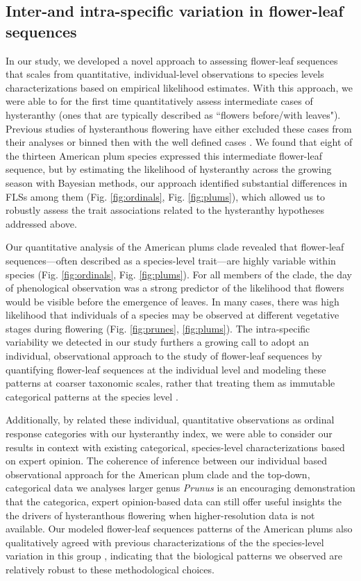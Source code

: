 \documentclass{article}[11pt]
\begin{document}
{\subsection*{Inter-and intra-specific variation in flower-leaf sequences}
In our study, we developed a novel approach to assessing flower-leaf sequences that scales from quantitative, individual-level observations to species levels characterizations based on empirical likelihood estimates. With this approach, we were able to for the first time quantitatively assess intermediate cases of hysteranthy (ones that are typically described as ``flowers before/with leaves"). Previous studies of hysteranthous flowering have either excluded these cases from their analyses  \citep[e.g.;][]{Gougherty2018} or binned then with the well defined cases \citep[e.g.;][]{Buonaiuto2020}. We found that eight of the thirteen American plum species expressed this intermediate flower-leaf sequence, but by estimating the likelihood of hysteranthy across the growing season with Bayesian methods, our approach identified substantial differences in FLSs among them (Fig. \ref{fig:ordinals}, Fig. \ref{fig:plums}), which allowed us to robustly assess the trait associations related to the hysteranthy hypotheses addressed above.

Our quantitative analysis of the American plums clade revealed that flower-leaf sequences---often described as a species-level trait---are highly variable within species (Fig. \ref{fig:ordinals}, Fig. \ref{fig:plums}). For all members of the clade, the day of phenological observation was a strong predictor of the likelihood that flowers would be visible before the emergence of leaves. In many cases, there was high likelihood that individuals of a species may be observed at different vegetative stages during flowering (Fig. \ref{fig:prunes}, \ref{fig:plums}). The intra-specific variability we detected in our study furthers a growing call to adopt an individual, observational approach to the study of flower-leaf sequences by quantifying flower-leaf sequences at the individual level and modeling these patterns at coarser taxonomic scales, rather that treating them as immutable categorical patterns at the species level \citep{Buonaiuto2020}. 

Additionally, by related these individual, quantitative observations as ordinal response categories with our hysteranthy index, we were able to consider our results in context with existing categorical, species-level characterizations based on expert opinion. The coherence of inference between our individual based observational approach for the American plum clade and the top-down, categorical data we analyses larger genus \emph{Prunus} is an encouraging demonstration that the categorica, expert opinion-based data can still offer useful insights the the drivers of hysteranthous flowering when higher-resolution data is not available. Our modeled flower-leaf sequences patterns of the American plums also qualitatively agreed with previous characterizations of the the species-level variation in this group \citep{Shaw:2004aa}, indicating that the biological patterns we observed are relatively robust to these methodological choices.

}
\end{document}
